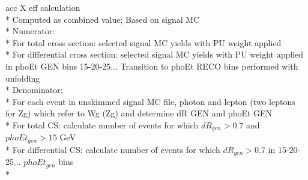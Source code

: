 \documentclass{beamer}
\begin{document}
\begin{frame}{acc X eff calculation}\\*
  \scriptsize Computed as combined value; Based on signal MC\\*
  \scriptsize Numerator:\\*
  \scriptsize For total cross section: selected signal MC yields with PU weight applied\\*
  \scriptsize For differential cross section: selected signal MC yields with PU weight applied in phoEt GEN bins 15-20-25... Transition to phoEt RECO bins performed with unfolding\\*
  \scriptsize Denominator:\\*
  \scriptsize For each event in unskimmed signal MC file, photon and lepton (two leptons for Zg) which refer to Wg (Zg) and determine dR GEN and phoEt GEN\\*
  \scriptsize For total CS: calculate number of events for which $dR_{gen}>0.7$ and $phoEt_{gen}>15$ GeV\\*
  \scriptsize For differential CS: calculate number of events for which $dR_{gen}>0.7$ in 15-20-25... $phoEt_{gen}$ bins\\*
\end{frame}
\end{document}
